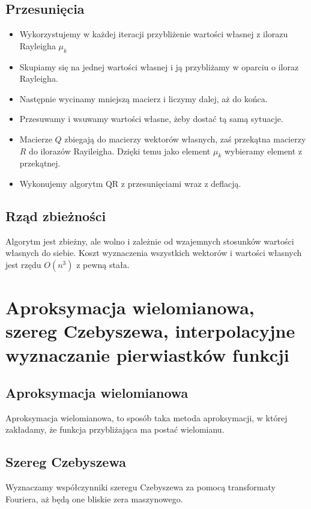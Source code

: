 \documentclass[a4paper]{article}
\begin{document}
\subsection{Przesunięcia}
\begin{itemize}
    \item Wykorzystujemy w każdej iteracji przybliżenie wartości własnej z ilorazu Rayleigha $\mu_k$
    \item Skupiamy się na jednej wartości własnej i ją przybliżamy w oparciu o iloraz Rayleigha.
    \item Następnie wycinamy mniejszą macierz i liczymy dalej, aż do końca.
    \item Przesuwamy i wsuwamy wartości własne, żeby dostać tą samą sytuacje.
    \item Macierze $Q$ zbiegają do macierzy wektorów własnych, zaś przekątna macierzy $R$ do ilorazów Rayileigha. Dzięki temu jako element $\mu_k$ wybieramy element z przekątnej.
    \item Wykonujemy algorytm QR z przesunięciami wraz z deflacją.
\end{itemize}

\subsection{Rząd zbieżności}
Algorytm jest zbieżny, ale wolno i zależnie od wzajemnych stosunków wartości własnych do siebie. Koszt wyznaczenia wszystkich wektorów i wartości własnych jest rzędu $O(n^3)$ z pewną stała.

\section{Aproksymacja wielomianowa, szereg Czebyszewa, interpolacyjne wyznaczanie pierwiastków funkcji}
\subsection{Aproksymacja wielomianowa}
Aproksymacja wielomianowa, to sposób taka metoda aproksymacji, w której zakładamy, że funkcja przybliżająca ma postać wielomianu.

\subsection{Szereg Czebyszewa}
Wyznaczamy współczynniki szeregu Czebyszewa za pomocą transformaty Fouriera, aż będą one bliskie zera maszynowego.
\end{document}
